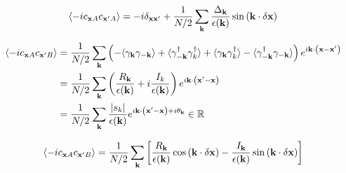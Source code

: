 \begin{equation}\label{eq:AA-correlation-magnetic}
   \langle -ic_{\mathbf{x}A}c_{\mathbf{x}'A} \rangle 
   =
   -i\delta_{\mathbf{x}\mathbf{x}'}
   +
   \frac{1}{N/2}
  \sum_{\mathbf{k}}
  \frac{\Delta_{\mathbf{k}}}{\epsilon(\mathbf{k})}
  \sin\left( \mathbf{k}\cdot\delta\mathbf{x} \right)
\end{equation}

\begin{align*}
  \langle -ic_{\mathbf{x}A}c_{\mathbf{x}'B} \rangle 
  &= 
  \frac{1}{N/2}\sum_{\mathbf{k}}\left(  -\langle \gamma_{\mathbf{k}}\gamma_{-\mathbf{k}} \rangle + \langle \gamma_{-\mathbf{k}}^\dagger\gamma^\dagger_{k} \rangle +
  \langle \gamma_{\mathbf{k}}\gamma_{k}^\dagger \rangle - 
  \langle \gamma_{-\mathbf{k}}^\dagger\gamma_{-\mathbf{k}} \rangle
   \right)e^{i\mathbf{k}\cdot\left( \mathbf{x}-\mathbf{x'} \right)} \\
  &= 
  \frac{1}{N/2} \sum_{\mathbf{k}}
  \left( 
      \frac{R_{\mathbf{k}}}{\epsilon(\mathbf{k})} + i\frac{I_k}{\epsilon(\mathbf{k})}
   \right) e^{i\mathbf{k}\cdot\left( \mathbf{x}'-\mathbf{x} \right)} \\
  &=
  \frac{1}{N/2} \sum_{\mathbf{k}}
  \frac{\left| s_k \right|}{\epsilon(\mathbf{k})}
  e^{i\mathbf{k}\cdot\left( \mathbf{x}'-\mathbf{x} \right) + i\theta_{\mathbf{k}} } \in \mathbb{R}
\end{align*}

\begin{equation}\label{eq:AB-correlation-magnetic}
    \langle -ic_{\mathbf{x}A}c_{\mathbf{x}'B} \rangle 
    =
    \frac{1}{N/2}
    \sum_{\mathbf{k}}
    \left[ 
        \frac{R_{\mathbf{k}}}{\epsilon(\mathbf{k})} \cos\left( \mathbf{k}\cdot\delta\mathbf{x} \right)
        -
        \frac{I_{\mathbf{k}}}{\epsilon(\mathbf{k})} \sin\left( \mathbf{k}\cdot\delta\mathbf{x} \right)
     \right]
\end{equation}

